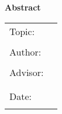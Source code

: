 
\begin{center}
{\Large \textbf{Abstract}}
\end{center}

\bigskip

\begin{center}
	\begin{tabular}{p{2.8cm}p{10cm}}
		Topic: & \thema \\
		 & \\
		Author: & \autorAbs \\
		 & \\
		Advisor: & \prueferA  \\[.5ex]
		 &  \prueferB \\
		 & \\
		Date: & \abgabedatum \\
		 & \\
	\end{tabular}
\end{center}

\bigskip

\noindent
\zusammenfassung